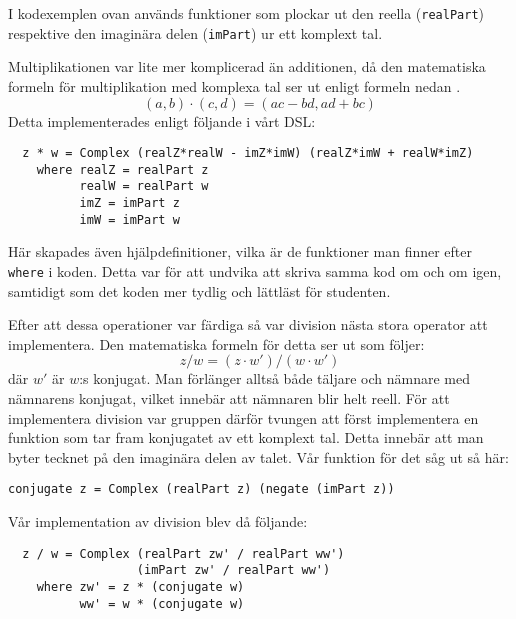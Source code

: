 \documentclass[12pt,a4paper,twoside,openright]{article}
\begin{document}
I kodexemplen ovan används funktioner som plockar ut den reella
(\texttt{realPart}) respektive den imaginära delen
(\texttt{imPart}) ur ett komplext tal.

Multiplikationen var lite mer komplicerad än additionen, då den
matematiska formeln för multiplikation med komplexa tal ser ut enligt
formeln nedan \cite{conway1978functions}.
\[(a, b) \cdot (c, d) = (ac - bd, ad + bc) \]
Detta implementerades enligt följande i vårt DSL:
\begin{verbatim}
  z * w = Complex (realZ*realW - imZ*imW) (realZ*imW + realW*imZ)
    where realZ = realPart z
          realW = realPart w
          imZ = imPart z
          imW = imPart w
\end{verbatim}

Här skapades även hjälpdefinitioner, vilka är de funktioner man finner
efter \texttt{where} i koden. Detta var för att undvika
att skriva samma kod om och om igen, samtidigt som det koden mer
tydlig och lättläst för studenten.

Efter att dessa operationer var färdiga så var division nästa stora
operator att implementera. Den matematiska formeln för detta ser ut
som följer:
\[ z / w = (z \cdot w') / (w \cdot w') \]
där \(w'\) är \(w\):s konjugat.
Man förlänger alltså både täljare och nämnare med nämnarens konjugat,
vilket innebär att nämnaren blir helt reell. För att implementera
division var gruppen därför tvungen att först implementera en funktion
som tar fram konjugatet av ett komplext tal. Detta innebär att man
byter tecknet på den imaginära delen av talet. Vår funktion för det
såg ut så här:

\begin{verbatim}
conjugate z = Complex (realPart z) (negate (imPart z))
\end{verbatim}
Vår implementation av division blev då följande:
\begin{verbatim}
  z / w = Complex (realPart zw' / realPart ww')
                  (imPart zw' / realPart ww')
    where zw' = z * (conjugate w)
          ww' = w * (conjugate w)
\end{verbatim}
\end{document}
